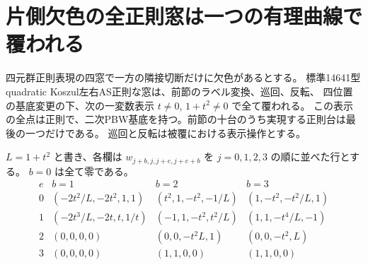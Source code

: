 \section{片側欠色の全正則窓は一つの有理曲線で覆われる}
\label{sec:klein-single-missing-windows}
\begin{theorem}\label{thm:klein-single-missing-windows}
四元群正則表現の四窓で一方の隣接切断だけに欠色があるとする。
標準14641型quadratic Koszul左右AS正則な窓は、前節のラベル変換、巡回、反転、
四位置の基底変更の下、次の一変数表示 $t\ne0$, $1+t^2\ne0$ で全て覆われる。
この表示の全点は正則で、二次PBW基底を持つ。前節の十台のうち実現する正則台は最後の一つだけである。
巡回と反転は被覆における表示操作とする。
\end{theorem}
$L=1+t^2$ と書き、各欄は $w_{j+b,j,j+e,j+e+b}$ を $j=0,1,2,3$ の順に並べた行とする。
$b=0$ は全て零である。
\[
\begin{array}{c|c|c|c}
 e & b=1 & b=2 & b=3\\\hline
 0&(-2t^2/L,-2t^2,1,1)&(t^2,1,-t^2,-1/L)&(1,-t^2,-t^2/L,1)\\
 1&(-2t^3/L,-2t,t,1/t)&(-1,1,-t^2,t^2/L)&(1,1,-t^4/L,-1)\\
 2&(0,0,0,0)&(0,0,-t^2 L,1)&(0,0,-t^2,L)\\
 3&(0,0,0,0)&(1,1,0,0)&(1,1,0,0)
\end{array}
\]
